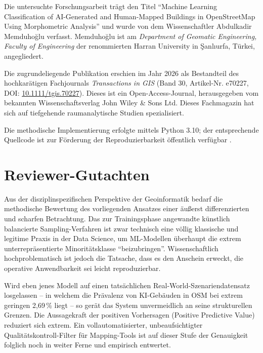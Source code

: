 \documentclass[12pt,twoside=false,a4paper,parskip]{scrbook}
\begin{document}
Die untersuchte Forschungsarbeit trägt den Titel \enquote{Machine Learning Classification of AI-Generated and Human-Mapped Buildings in OpenStreetMap Using Morphometric Analysis} \cite[S.~1]{memduhoglu2026ml} und wurde von dem Wissenschaftler Abdulkadir Memduho\u{g}lu verfasst. Memduho\u{g}lu ist am \textit{Department of Geomatic Engineering, Faculty of Engineering} der renommierten Harran University in \c{S}anl{\i}urfa, Türkei, angegliedert.

Die zugrundeliegende Publikation erschien im Jahr 2026 als Bestandteil des hochkarätigen Fachjournals \textit{Transactions in GIS} (Band 30, Artikel-Nr. e70227, DOI: \href{https://doi.org/10.1111/tgis.70227}{10.1111/tgis.70227}). Dieses ist ein Open-Access-Journal, herausgegeben vom bekannten Wissenschaftsverlag John Wiley \& Sons Ltd. Dieses Fachmagazin hat sich auf tiefgehende raumanalytische Studien spezialisiert.

Die methodische Implementierung erfolgte mittels Python 3.10; der entsprechende Quellcode ist zur Förderung der Reproduzierbarkeit öffentlich verfügbar \cite[S.~5]{memduhoglu2026ml}.


\chapter{Reviewer-Gutachten} \label{sec:reviewer}

Aus der disziplinspezifischen Perspektive der Geoinformatik bedarf die methodische Bewertung des vorliegenden Ansatzes einer äußerst differenzierten und scharfen Betrachtung. Das zur Trainingsphase angewandte künstlich balancierte Sampling-Verfahren ist zwar technisch eine völlig klassische und legitime Praxis in der Data Science, um ML-Modellen überhaupt die extrem unterrepräsentierte Minoritätsklasse \enquote{beizubringen}. Wissenschaftlich hochproblematisch ist jedoch die Tatsache, dass es den Anschein erweckt, die operative Anwendbarkeit sei leicht reproduzierbar.

Wird eben jenes Modell auf einen tatsächlichen Real-World-Szenariendatensatz losgelassen – in welchem die Prävalenz von KI-Gebäuden in OSM bei extrem geringen 2,69\,\% liegt – so gerät das System unvermeidlich an seine strukturellen Grenzen. Die Aussagekraft der positiven Vorhersagen (Positive Predictive Value) reduziert sich extrem. Ein vollautomatisierter, unbeaufsichtigter Qualitätskontroll-Filter für Mapping-Tools ist auf dieser Stufe der Genauigkeit folglich noch in weiter Ferne und empirisch entwertet.
\end{document}
